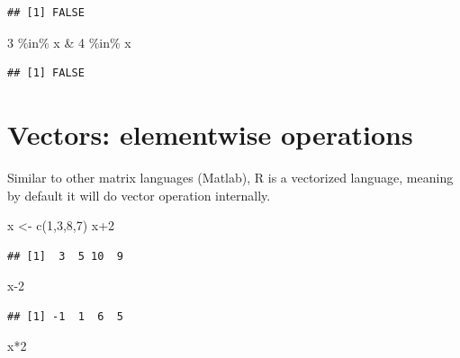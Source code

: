 \documentclass[
  11pt,
]{book}
\newenvironment{Shaded}{\begin{snugshade}}{\end{snugshade}}
\newcommand{\DecValTok}[1]{\textcolor[rgb]{0.00,0.00,0.81}{#1}}
\newcommand{\FunctionTok}[1]{\textcolor[rgb]{0.00,0.00,0.00}{#1}}
\newcommand{\NormalTok}[1]{#1}
\newcommand{\OtherTok}[1]{\textcolor[rgb]{0.56,0.35,0.01}{#1}}
\newcommand{\SpecialCharTok}[1]{\textcolor[rgb]{0.00,0.00,0.00}{#1}}
\begin{document}
\begin{verbatim}
## [1] FALSE
\end{verbatim}

\begin{Shaded}
\begin{Highlighting}[]
\DecValTok{3} \SpecialCharTok{\%in\%}\NormalTok{ x }\SpecialCharTok{\&} \DecValTok{4} \SpecialCharTok{\%in\%}\NormalTok{ x}
\end{Highlighting}
\end{Shaded}

\begin{verbatim}
## [1] FALSE
\end{verbatim}

\hypertarget{vectors-elementwise-operations}{%
\section{Vectors: elementwise operations}\label{vectors-elementwise-operations}}

Similar to other matrix languages (Matlab), R is a vectorized language, meaning by default it will do vector operation internally.

\begin{Shaded}
\begin{Highlighting}[]
\NormalTok{x }\OtherTok{\textless{}{-}} \FunctionTok{c}\NormalTok{(}\DecValTok{1}\NormalTok{,}\DecValTok{3}\NormalTok{,}\DecValTok{8}\NormalTok{,}\DecValTok{7}\NormalTok{)}
\NormalTok{x}\SpecialCharTok{+}\DecValTok{2}
\end{Highlighting}
\end{Shaded}

\begin{verbatim}
## [1]  3  5 10  9
\end{verbatim}

\begin{Shaded}
\begin{Highlighting}[]
\NormalTok{x}\DecValTok{{-}2}
\end{Highlighting}
\end{Shaded}

\begin{verbatim}
## [1] -1  1  6  5
\end{verbatim}

\begin{Shaded}
\begin{Highlighting}[]
\NormalTok{x}\SpecialCharTok{*}\DecValTok{2}
\end{Highlighting}
\end{Shaded}
\end{document}
